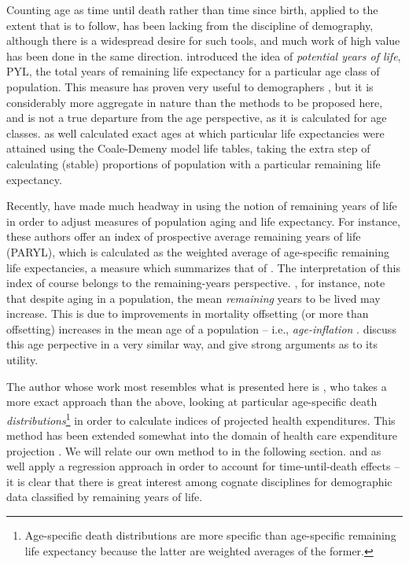 Counting age as time until death rather than time
since birth, applied to the extent that is to
follow, has been lacking from the discipline of demography, although there is a
widespread desire for such tools, and much work of high value has been done in
the same direction. \citet{hersch1944demographie}
introduced the idea of \textit{potential years of life}, PYL, the
total years of remaining life expectancy for a particular age class of
population. This measure has proven very useful to demographers
\citep{panush1996potential}, but it is considerably more aggregate in 
nature than the methods to be proposed
here, and is not a true departure from the age perspective, as it is calculated
for age classes. \citet{ryder1975notes} as well calculated exact ages at which
particular life expectancies were attained using the Coale-Demeny model
life tables, taking the extra step of calculating (stable) proportions
of population with a particular remaining life expectancy.

Recently, 
\citet{sanderson2005average, sanderson2010remeasuring} have made much
headway in using the notion of remaining years of life in
 order to adjust measures of population aging and life expectancy. For instance, 
 these authors offer an index of prospective average remaining years of life
 (PARYL), which is calculated as the weighted average of age-specific 
 remaining life expectancies, a measure which summarizes that of
 \citet{hersch1944demographie}. The interpretation of this index of
 course belongs to the remaining-years perspective.
 \citet{sanderson2005average}, for instance, note that despite aging 
 in a population, the mean \textit{remaining} years to 
 be lived may increase. This is due to improvements in mortality offsetting 
 (or more than offsetting) increases in the mean age of a population -- i.e.,
 \textit{age-inflation} \citep{shoven2010adjusting}. \citet{sanderson2007new}
 discuss this age perpective in a very similar way, and give strong arguments
 as to its utility.

The author whose work most resembles what is
presented here is \citet{miller2001increasing}, who takes a more
exact approach than the above, looking at particular age-specific death
\textit{distributions}\footnote{Age-specific death distributions are more
 specific than age-specific remaining life expectancy because the latter are
 weighted averages of the former.} in order to calculate indices
 of projected health expenditures. This method has been extended somewhat into
 the domain of health care expenditure projection
 \citep{lee2002approach,lee2007demographic,topoleski2004uncertainty}. We will
 relate our own method to \citet{miller2001increasing} in the
 following section. \citet{stearns2004time} and \citet{seshamani2004longitudinal} as well apply a regression approach in
 order to account for time-until-death effects -- it is clear that there is
 great interest among cognate disciplines for demographic data classified by remaining
 years of life.
 
